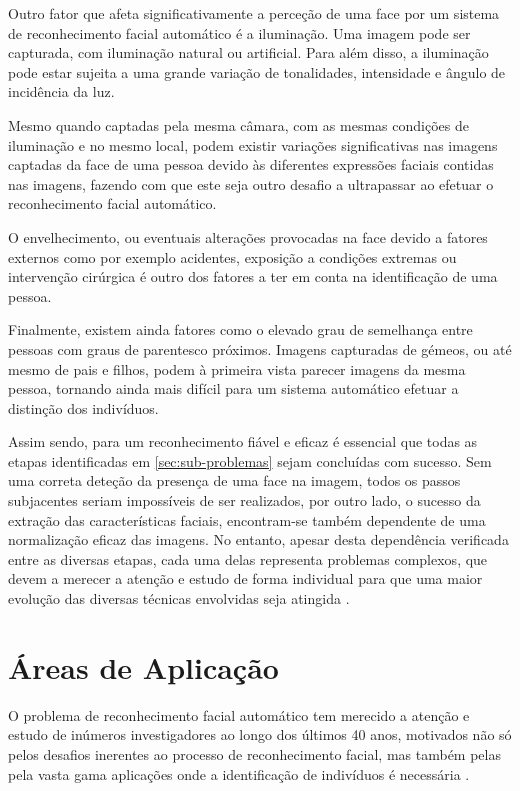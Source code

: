 Outro fator que afeta significativamente a perceção de uma face por um sistema de reconhecimento facial automático é a iluminação. Uma imagem pode ser capturada, com iluminação natural ou artificial. Para além disso, a iluminação pode estar sujeita a uma grande variação de tonalidades, intensidade e ângulo de incidência da luz.

Mesmo quando captadas pela mesma câmara, com as mesmas condições de iluminação e no mesmo local, podem existir variações significativas nas imagens captadas da face de uma pessoa devido às diferentes expressões faciais contidas nas imagens, fazendo com que este seja outro desafio a ultrapassar ao efetuar o reconhecimento facial automático.

O envelhecimento, ou eventuais alterações provocadas na face devido a fatores externos como por exemplo acidentes, exposição a condições extremas ou intervenção cirúrgica é outro dos fatores a ter em conta na identificação de uma pessoa.

Finalmente, existem ainda fatores como o elevado grau de semelhança entre pessoas com graus de parentesco próximos. Imagens capturadas de gémeos, ou até mesmo de pais e filhos, podem à primeira vista parecer imagens da mesma pessoa, tornando ainda mais difícil para um sistema automático efetuar a distinção dos indivíduos.

Assim sendo, para um reconhecimento fiável e eficaz é essencial que todas as etapas identificadas em \ref{sec:sub-problemas} sejam concluídas com sucesso. Sem uma correta deteção da presença de uma face na imagem, todos os passos subjacentes seriam impossíveis de ser realizados, por outro lado, o sucesso da extração das características faciais, encontram-se também dependente de uma normalização eficaz das imagens. No entanto, apesar desta dependência verificada entre as diversas etapas, cada uma delas representa problemas complexos, que devem a merecer a atenção e estudo de forma individual para que uma maior evolução das diversas técnicas envolvidas seja atingida \citep{Zhao2003}.


\section{Áreas de Aplicação}\label{sec:areasAplicacao}
O problema de reconhecimento facial automático tem merecido a atenção e estudo de inúmeros investigadores ao longo dos últimos 40 anos, motivados não só pelos desafios inerentes ao processo de reconhecimento facial, mas também pelas pela vasta gama aplicações onde a identificação de indivíduos é necessária \citep{Li2011}.

